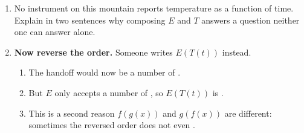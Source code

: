 \documentclass[10pt]{article}
\begin{document}
\begin{tcolorbox}[colback=white, colframe=black!40,
    title=\textbf{Tier A --- Approaching Proficiency},
    fonttitle=\bfseries, arc=2mm, left=3mm, right=3mm, top=2mm, bottom=2mm]
\begin{enumerate}[itemsep=8pt]
  \item No instrument on this mountain reports temperature as a function of
        time. Explain in two sentences why composing $E$ and $T$ answers a
        question neither one can answer alone.

        \vspace{0.05in}

  \item \textbf{Now reverse the order.} Someone writes $E(T(t))$ instead.

        \begin{enumerate}[label=(\alph*), itemsep=4pt]
          \item The handoff would now be a number of \blank{2.4cm}.
          \item But $E$ only accepts a number of \blank{2.4cm}, so
                $E(T(t))$ is \blank{3cm}.
          \item This is a second reason $f(g(x))$ and $g(f(x))$ are different:
                sometimes the reversed order does not even \blank{2.6cm}.
        \end{enumerate}
\end{enumerate}
\end{tcolorbox}

\vspace{0.1in}
\end{document}
